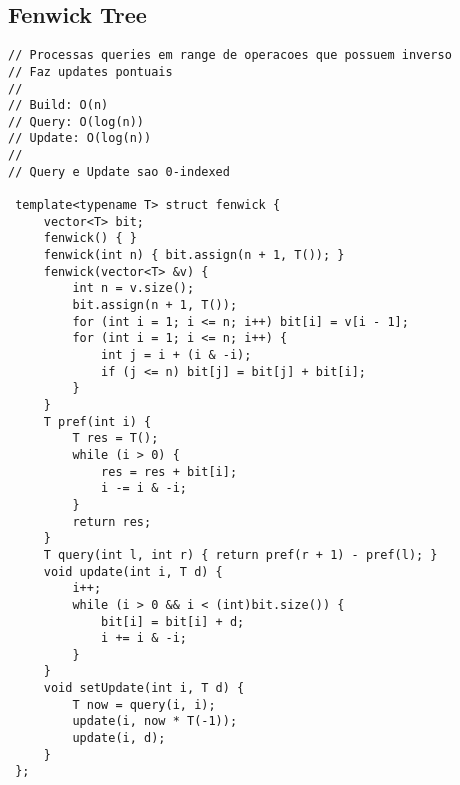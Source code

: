 \documentclass[11pt, a4paper, twoside]{article}
\begin{document}
\subsection{Fenwick Tree}
\begin{lstlisting}
// Processas queries em range de operacoes que possuem inverso
// Faz updates pontuais
//
// Build: O(n)
// Query: O(log(n))
// Update: O(log(n))
//
// Query e Update sao 0-indexed

 template<typename T> struct fenwick {
     vector<T> bit;
     fenwick() { }
     fenwick(int n) { bit.assign(n + 1, T()); }
     fenwick(vector<T> &v) {
         int n = v.size();
         bit.assign(n + 1, T());
         for (int i = 1; i <= n; i++) bit[i] = v[i - 1];
         for (int i = 1; i <= n; i++) {
             int j = i + (i & -i);
             if (j <= n) bit[j] = bit[j] + bit[i];
         }
     }
     T pref(int i) {
         T res = T();
         while (i > 0) {
             res = res + bit[i];
             i -= i & -i;
         }
         return res;
     }
     T query(int l, int r) { return pref(r + 1) - pref(l); }
     void update(int i, T d) {
         i++;
         while (i > 0 && i < (int)bit.size()) {
             bit[i] = bit[i] + d;
             i += i & -i;
         }
     }
     void setUpdate(int i, T d) {
         T now = query(i, i);
         update(i, now * T(-1));
         update(i, d);
     }
 };
\end{lstlisting}
\end{document}

